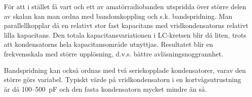 För att i stället få vart och ett av amatörradiobanden utspridda över
större delen av skalan kan man ordna med bandomkoppling och
s.k. bandspridning. Man parallellkopplar då en relativt stor fast
kapacitans med vridkondensatorns relativt lilla kapacitans. Den totala
kapacitansvariationen i LC-kretsen blir då liten, trots att
kondensatorns hela kapacitansområde utnyttjas. Resultatet blir en
frekvensskala med större upplösning, d.v.s. bättre
avläsningsnoggrannhet.

Bandspridning kan också ordnas med två seriekopplade kondensatorer,
varav den större görs variabel. Typiskt värde på vridkondensatorn i en
kortvågsutrustning är då 100--500~pF och den fasta kondensatorn mycket
mindre än så.
